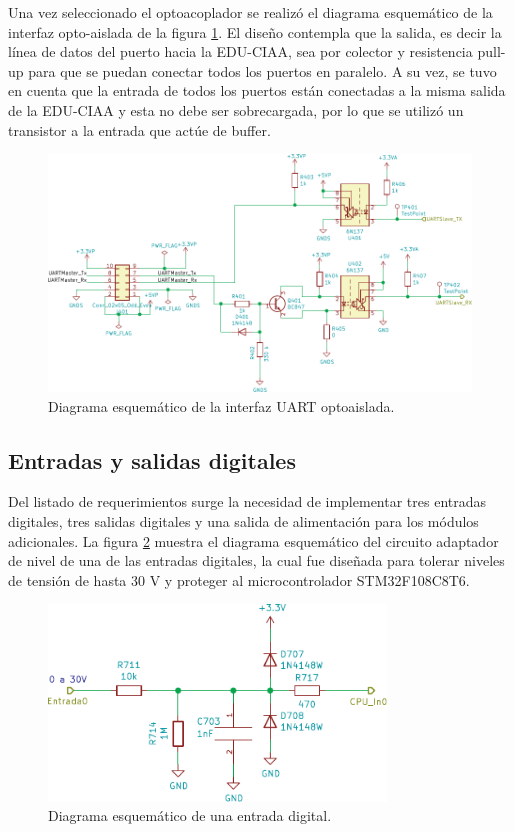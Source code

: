 Una vez seleccionado el optoacoplador se realizó el diagrama esquemático de la interfaz opto-aislada de la figura \ref{fig:InterfazOpto}. El diseño contempla que la salida, es decir la línea de datos del puerto hacia la EDU-CIAA, sea por colector y resistencia pull-up para que se puedan conectar todos los puertos en paralelo. A su vez, se tuvo en cuenta que la entrada de todos los puertos están conectadas a la misma salida de la EDU-CIAA y esta no debe ser sobrecargada, por lo que se utilizó un transistor a la entrada que actúe de buffer.

\begin{figure}[H]
	\centering
	\includegraphics[width=1\textwidth]{./Figures/InterfazOpto.pdf}
	\caption{Diagrama esquemático de la interfaz UART optoaislada.}
	\label{fig:InterfazOpto}
\end{figure}


\subsection{Entradas y salidas digitales}

Del listado de requerimientos surge la necesidad de implementar tres entradas digitales, tres salidas digitales y una salida de alimentación para los módulos adicionales. La figura \ref{fig:EntradaDigital} muestra el diagrama esquemático del circuito adaptador de nivel de una de las entradas digitales, la cual fue diseñada para tolerar niveles de tensión de hasta 30 V y proteger al microcontrolador STM32F108C8T6.

\begin{figure}[H]
	\centering
	\includegraphics[width=0.8\textwidth]{./Figures/EntradaDigital.pdf}
	\caption{Diagrama esquemático de una entrada digital.}
	\label{fig:EntradaDigital}
\end{figure}

